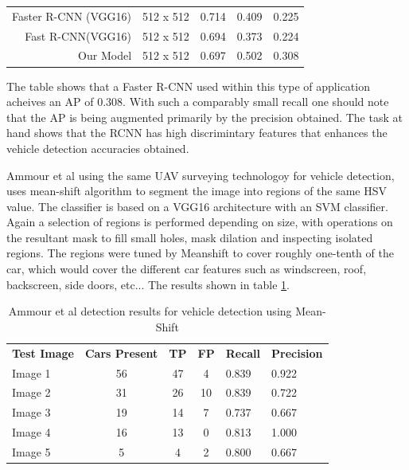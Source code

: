 \documentclass{IEEEtran}
\begin{document}
\begin{table}[ht]
\begin{tabular}{rlccc}
Faster R-CNN (VGG16)                           & 512 x 512                                & 0.714                                & 0.409                            & 0.225                                  \\
Fast R-CNN(VGG16)                              & 512 x 512                                & 0.694                                & 0.373                            & 0.224                                  \\
Our Model                                      & 512 x 512                                & 0.697                                & 0.502                            & 0.308                                 
\end{tabular}
\end{table}

The table \cite{Zhong2017} shows that a Faster R-CNN used within this type of application acheives an AP of 0.308. With such a comparably small recall one should note that the AP is being augmented primarily by the precision obtained. The task at hand shows that the RCNN has high discrimintary features that enhances the vehicle detection accuracies obtained.\newline 


Ammour et al \cite{Ammour2017} using the same UAV surveying technologoy for vehicle detection, uses mean-shift algorithm to segment the image into regions of the same HSV value. The classifier is based on a VGG16 architecture with an SVM classifier. Again a selection of regions is performed depending on size, with operations on the resultant mask to fill small holes, mask dilation and inspecting isolated regions. The regions were tuned by Meanshift to cover roughly one-tenth of the car, which would cover the different car features such as windscreen, roof, backscreen, side doors, etc... The results shown in table \ref{meanshiftveh}.

\begin{table}[ht]
\centering
\caption{Ammour et al \cite{Ammour2017} detection results for vehicle detection using Mean-Shift}
\label{meanshiftveh}
\begin{tabular}{lcccll}
\textbf{Test Image} & \textbf{Cars Present} & \textbf{TP} & \textbf{FP} & \textbf{Recall} & \textbf{Precision} \\
Image 1             & 56                    & 47          & 4           & 0.839           & 0.922              \\
Image 2             & 31                    & 26          & 10          & 0.839           & 0.722              \\
Image 3             & 19                    & 14          & 7           & 0.737           & 0.667              \\
Image 4             & 16                    & 13          & 0           & 0.813           & 1.000              \\
Image 5             & 5                     & 4           & 2           & 0.800           & 0.667             
\end{tabular}
\end{table}
\end{document}
